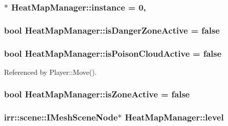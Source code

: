 \hypertarget{class_heat_map_manager_a11d267fe86b6494e623674c2a8a8801a}{
\subsubsection[{instance}]{ $\ast$ Heat\-Map\-Manager\-::instance = 0\hspace{0.3cm}{\ttfamily [static]}, {\ttfamily [private]}}}\label{class_heat_map_manager_a11d267fe86b6494e623674c2a8a8801a}
\hypertarget{class_heat_map_manager_aa8c35fb977284623b8399a7150f68cc9}{
\subsubsection[{is\-Danger\-Zone\-Active}]{\setlength{\rightskip}{0pt plus 5cm}bool Heat\-Map\-Manager\-::is\-Danger\-Zone\-Active = false}}\label{class_heat_map_manager_aa8c35fb977284623b8399a7150f68cc9}
\hypertarget{class_heat_map_manager_affcd194d19a8b51c54bce180d1ca2393}{
\subsubsection[{is\-Poison\-Cloud\-Active}]{\setlength{\rightskip}{0pt plus 5cm}bool Heat\-Map\-Manager\-::is\-Poison\-Cloud\-Active = false}}\label{class_heat_map_manager_affcd194d19a8b51c54bce180d1ca2393}


Referenced by Player\-::\-Move().

\hypertarget{class_heat_map_manager_af53f13b64f955d297dd1d6a489ac2053}{
\subsubsection[{is\-Zone\-Active}]{\setlength{\rightskip}{0pt plus 5cm}bool Heat\-Map\-Manager\-::is\-Zone\-Active = false\hspace{0.3cm}{\ttfamily [private]}}}\label{class_heat_map_manager_af53f13b64f955d297dd1d6a489ac2053}
\hypertarget{class_heat_map_manager_a63ca12aefa554bf0756608865f1e1909}{
\subsubsection[{level}]{\setlength{\rightskip}{0pt plus 5cm}irr\-::scene\-::\-I\-Mesh\-Scene\-Node$\ast$ Heat\-Map\-Manager\-::level}}\label{class_heat_map_manager_a63ca12aefa554bf0756608865f1e1909}


